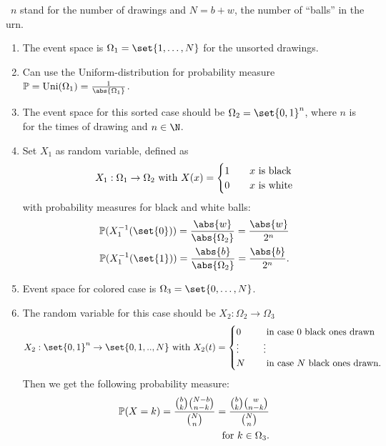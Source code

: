 \begin{solution}\ $n$ stand for the number of drawings and $N = b+w$, the number of ``balls'' in the urn.
	\begin{enumerate}[label=\alph*)]
		\item The event space is $\Omega_1 = \set{1,\dots, N}$ for the unsorted drawings.
		\item Can use the Uniform-distribution for probability measure $\Meas = \Uni(\Omega_1) = \frac{1}{\abs{\Omega_1}}$.
		\item The event space for this sorted case should be $\Omega_2 = \set{0,1}^n$, where $n$ is for the times of drawing and $n \in \N$.
		\item Set $X_1$ as random variable, defined as 
		\begin{align*}
			X_1: \Omega_1 \to \Omega_2 \text{ with } 
			X(x) = \begin{cases}
				1 \quad &x \text{ is black}\\
				0 \quad &x \text{ is white}
			\end{cases}
		\end{align*}
		with probability measures for black and white balls:
		\begin{align*}
			\Meas(X_1^{-1}(\set{0})) = \frac{\abs{w}}{\abs{\Omega_2}} = \frac{\abs{w}}{2^n}\\
			\Meas(X_1^{-1}(\set{1})) = \frac{\abs{b}}{\abs{\Omega_2}} = \frac{\abs{b}}{2^n}.
		\end{align*}
		\item Event space for colored case is $\Omega_3 = \set{0,\dots, N}$.
		\item The random variable for this case should be $X_2 : \Omega_2 \to \Omega_3$
		\begin{align*}
			X_2: \set{0,1}^n \to \set{0,1,..,N} \with
			X_2(t) = \begin{cases}
			0 \quad &\text{ in case 0 black ones drawn}\\
			\vdots &\vdots\\
			N \quad &\text{ in case $N$ black ones drawn}.
			\end{cases}
		\end{align*}
		Then we get the following probability measure:
		\begin{align*}
			\mathbb{P}(X = k) = \frac{\binom{b}{k}\binom{N-b}{n-k}}{\binom{N}{n}} = \frac{\binom{b}{k}\binom{w}{n-k}}{\binom{N}{n}}\\ \text{ for } k \in \Omega_3.
		\end{align*}
	\end{enumerate}
\end{solution}

